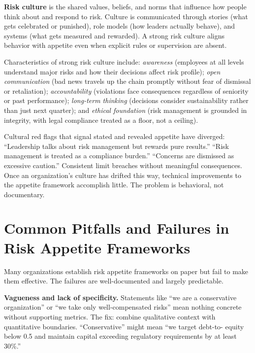 \documentclass[11pt,openany]{book}
\begin{document}
\textbf{Risk culture} is the shared values, beliefs, and norms that influence
how people think about and respond to risk. Culture is communicated through
stories (what gets celebrated or punished), role models (how leaders actually
behave), and systems (what gets measured and rewarded). A strong risk culture
aligns behavior with appetite even when explicit rules or supervision are absent.

Characteristics of strong risk culture include: \emph{awareness} (employees at
all levels understand major risks and how their decisions affect risk profile);
\emph{open communication} (bad news travels up the chain promptly without fear
of dismissal or retaliation); \emph{accountability} (violations face consequences
regardless of seniority or past performance); \emph{long-term thinking}
(decisions consider sustainability rather than just next quarter); and
\emph{ethical foundation} (risk management is grounded in integrity, with legal
compliance treated as a floor, not a ceiling).

Cultural red flags that signal stated and revealed appetite have diverged:
``Leadership talks about risk management but rewards pure results.'' ``Risk
management is treated as a compliance burden.'' ``Concerns are dismissed as
excessive caution.'' Consistent limit breaches without meaningful consequences.
Once an organization's culture has drifted this way, technical improvements to
the appetite framework accomplish little. The problem is behavioral, not
documentary.

\section{Common Pitfalls and Failures in Risk Appetite Frameworks}
\label{sec:pitfalls}

Many organizations establish risk appetite frameworks on paper but fail to make
them effective. The failures are well-documented and largely predictable.

\textbf{Vagueness and lack of specificity.} Statements like ``we are a
conservative organization'' or ``we take only well-compensated risks'' mean
nothing concrete without supporting metrics. The fix: combine qualitative context
with quantitative boundaries. ``Conservative'' might mean ``we target debt-to-
equity below 0.5 and maintain capital exceeding regulatory requirements by at
least 30\%.''
\end{document}
